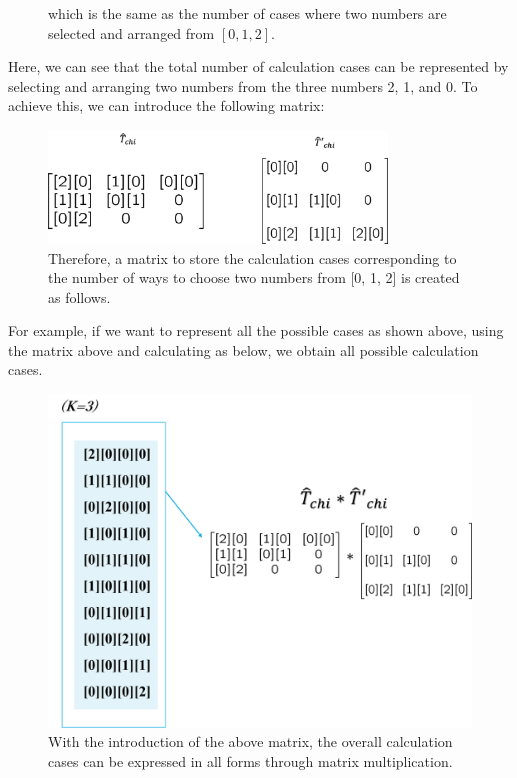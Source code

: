 \documentclass{article}[12pt]
\numberwithin{equation}{section}
\begin{document}
\begin{spacing}{1.5}
\begin{figure}[htbp]
{  which is the same as the number of cases where two numbers are selected and arranged from $[0, 1, 2]$.}
\end{figure}
Here, we can see that the total number of calculation cases can be represented by selecting and arranging two numbers from the three numbers 2, 1, and 0. To achieve this, we can introduce the following matrix:
\begin{figure}[htbp]
  \centerline{\includegraphics[width=9cm]{TexFigure/Tmat2.png}}
  \caption{Therefore, a matrix to store the calculation cases corresponding to the number of ways to choose two numbers from [0, 1, 2] is created as follows.}
\end{figure}
For example, if we want to represent all the possible cases as shown above, using the matrix above and calculating as below, we obtain all possible calculation cases.
\begin{figure}[htbp]
  \centerline{\includegraphics[width=12cm]{TexFigure/Tmat3.png}}
  \caption{With the introduction of the above matrix, the overall calculation cases can be expressed in all forms through matrix multiplication.}
\end{figure}

\pagebreak

\end{spacing}
\end{document}
